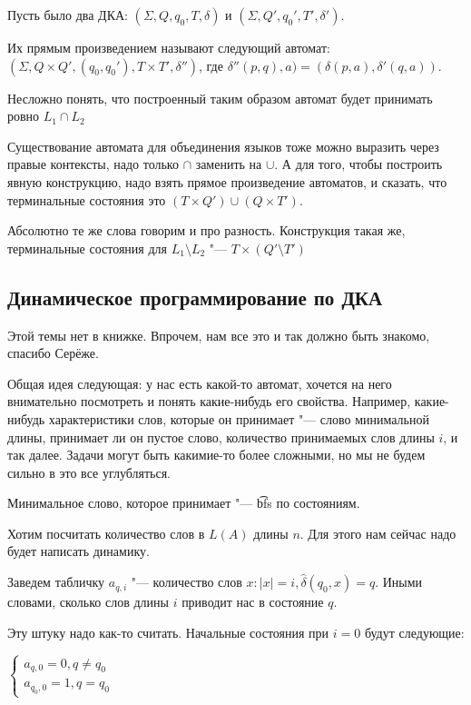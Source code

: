 \begin{Def}
Пусть было два ДКА: $(\Sigma, Q, q_0, T, \delta)$ и $(\Sigma, Q', q_0', T', \delta')$.

Их прямым произведением называют следующий автомат: $(\Sigma, Q \times Q', (q_0, q_0'), T \times T', \delta'')$, где $\delta''(p, q), a) = (\delta(p, a), \delta'(q, a))$.
\end{Def}
Несложно понять, что построенный таким образом автомат будет принимать ровно $L_1 \cap L_2$

Существование автомата для объединения языков тоже можно выразить через правые контексты, надо только $\cap$ заменить на $\cup$. 
А для того, чтобы построить явную конструкцию, надо взять прямое произведение автоматов, и сказать, что терминальные состояния это $(T \times Q') \cup (Q \times T')$.


Абсолютно те же слова говорим и про разность.
Конструкция такая же, терминальные состояния для $L_1 \setminus L_2$ "--- $T \times (Q' \setminus T')$


\subsection{Динамическое программирование по ДКА}
\begin{Rem}
Этой темы нет в книжке. Впрочем, нам все это и так должно быть знакомо, спасибо Серёже.
\end{Rem}

Общая идея следующая: у нас есть какой-то автомат, хочется на него внимательно посмотреть и понять какие-нибудь его свойства. 
Например, какие-нибудь характеристики слов, которые он принимает "--- слово минимальной длины, принимает ли он пустое слово, количество принимаемых слов длины $i$, и так далее.
Задачи могут быть какимие-то более сложными, но мы не будем сильно в это все углубляться.


Минимальное слово, которое принимает "--- \t{bfs} по состояниям.

Хотим посчитать количество слов в $L(A)$ длины $n$. Для этого нам сейчас надо будет написать динамику. 

Заведем табличку $a_{q, i}$ "--- количество слов $x: |x| = i, \hat \delta(q_0, x) = q$. 
Иными словами, сколько слов длины $i$ приводит нас в состояние $q$.

Эту штуку надо как-то считать. Начальные состояния при $i=0$ будут следующие:

$
    \begin{cases}
        a_{q, 0} = 0, q \neq q_0 \\
        a_{q_0, 0} = 1, q = q_0
    \end{cases} 
$

